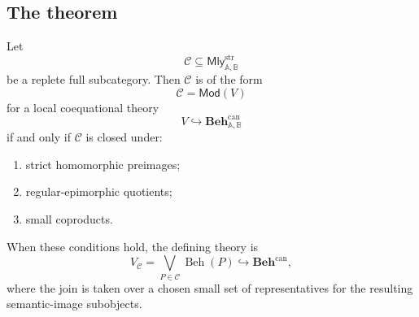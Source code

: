 \subsection{The theorem}
\label{subsec:local-coequational-birkhoff-theorem}

\begin{theorem}
\label{thm:local-coequational-birkhoff}
    Let
    \[
        \mathcal C\subseteq\mathsf{Mly}^{\mathrm{str}}_{\mathbb A,\mathbb B}
    \]
    be a replete full subcategory. Then \(\mathcal C\) is of the form
    \[
        \mathcal C=\mathsf{Mod}(V)
    \]
    for a local coequational theory
    \[
        V\hookrightarrow\mathbf{Beh}^{\mathrm{can}}_{\mathbb A,\mathbb B}
    \]
    if and only if \(\mathcal C\) is closed under:
    \begin{enumerate}
        \item strict homomorphic preimages;
        \item regular-epimorphic quotients;
        \item small coproducts.
    \end{enumerate}
    When these conditions hold, the defining theory is
    \[
        V_{\mathcal C}
        =
        \bigvee_{P\in\mathcal C}\operatorname{Beh}(P)
        \hookrightarrow\mathbf{Beh}^{\mathrm{can}},
    \]
    where the join is taken over a chosen small set of representatives for the
    resulting semantic-image subobjects.
\end{theorem}

